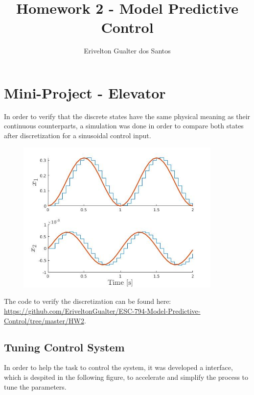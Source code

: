 \documentclass[12pt,a4paper]{article}
\title{Homework 2 - Model Predictive Control}
\author{Erivelton Gualter dos Santos}
\date{}
\begin{document}
\maketitle 

\section{Mini-Project - Elevator}

In order to verify that the discrete states have the same physical meaning as their continuous counterparts, a simulation was done in order to compare both states after discretization for a sinusoidal control input. 

\begin{figure}[H]
	\centering
    \includegraphics[width=0.9\textwidth]{compare.jpg}
\end{figure}

The code to verify the discretization can be found here: \url{https://github.com/EriveltonGualter/ESC-794-Model-Predictive-Control/tree/master/HW2}.

\subsection{Tuning Control System}

In order to help the task to control the system, it was developed a interface, which is despited in the following figure, to accelerate and simplify the process to tune the parameters. 
\end{document}
